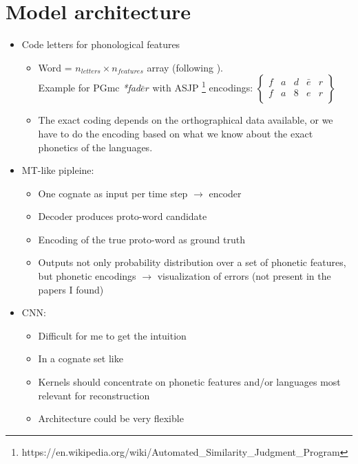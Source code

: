 \documentclass[a4paper, 10pt]{article}
\begin{document}
\section{Model architecture}
\begin{itemize}
    \item Code letters for phonological features
    \begin{itemize}
        \item Word = $n_{letters} \times n_{features}$ array (following \cite{rama_siamese_2016}). \\
        Example for PGmc \textit{*fad$\bar{e}r$} with ASJP
        \footnote{https://en.wikipedia.org/wiki/Automated\_Similarity\_Judgment\_Program} 
        encodings:
        \newline
        \newline
        $\begin{Bmatrix}
        f & a & d & \bar{e} & r \\
        f & a & 8 & e & r \\
        \end{Bmatrix}$ \\
        \normalsize
        \item The exact coding depends on the orthographical data available, or we have to do the encoding based on what we know about the exact phonetics of the languages.
    \end{itemize}
    \item MT-like pipleine:
    \begin{itemize}
        \item One cognate as input per time step $\rightarrow$ encoder
        \item Decoder produces proto-word candidate
        \item Encoding of the true proto-word as ground truth
        \item Outputs not only probability distribution over a set of phonetic features, but phonetic encodings $\rightarrow$ visualization of errors (not present in the papers I found)
    \end{itemize}
    \item CNN:
    \begin{itemize}
        \item Difficult for me to get the intuition
        \item In a cognate set like
        \item Kernels should concentrate on phonetic features and/or languages most relevant for reconstruction
        \item Architecture could be very flexible
    \end{itemize}
\end{itemize}
\end{document}
